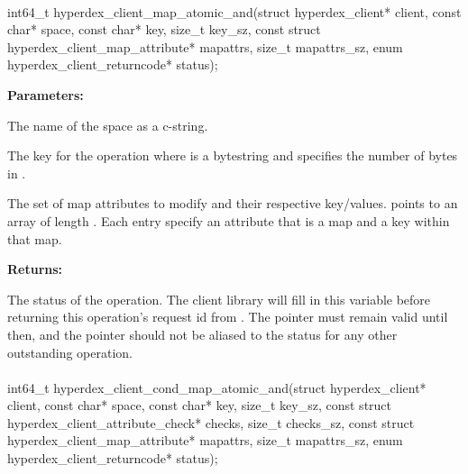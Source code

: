 \paragraph{}
\label{api:c:map_atomic_and}
\begin{ccode}
int64_t hyperdex_client_map_atomic_and(struct hyperdex_client* client,
                const char* space,
                const char* key, size_t key_sz,
                const struct hyperdex_client_map_attribute* mapattrs, size_t mapattrs_sz,
                enum hyperdex_client_returncode* status);
\end{ccode}
\funcdesc 

\noindent\textbf{Parameters:}
\begin{description}[labelindent=\widthof{{\code{mapattrs}, \code{mapattrs\_sz}}},leftmargin=*,noitemsep,nolistsep,align=right]
\item[\code{space}] The name of the space as a c-string.
\item[\code{key}, \code{key\_sz}] The key for the operation where  is a bytestring and  specifies the number of bytes in .
\item[\code{mapattrs}, \code{mapattrs\_sz}] The set of map attributes to modify and their respective key/values.   points to an array of length .  Each entry specify an attribute that is a map and a key within that map.
\end{description}

\noindent\textbf{Returns:}
\begin{description}[labelindent=\widthof{{\code{status}}},leftmargin=*,noitemsep,nolistsep,align=right]
\item[\code{status}] The status of the operation.  The client library will fill in this variable before returning this operation's request id from .  The pointer must remain valid until then, and the pointer should not be aliased to the status for any other outstanding operation.
\end{description}

\paragraph{}
\label{api:c:cond_map_atomic_and}
\begin{ccode}
int64_t hyperdex_client_cond_map_atomic_and(struct hyperdex_client* client,
                const char* space,
                const char* key, size_t key_sz,
                const struct hyperdex_client_attribute_check* checks, size_t checks_sz,
                const struct hyperdex_client_map_attribute* mapattrs, size_t mapattrs_sz,
                enum hyperdex_client_returncode* status);
\end{ccode}
\funcdesc 

